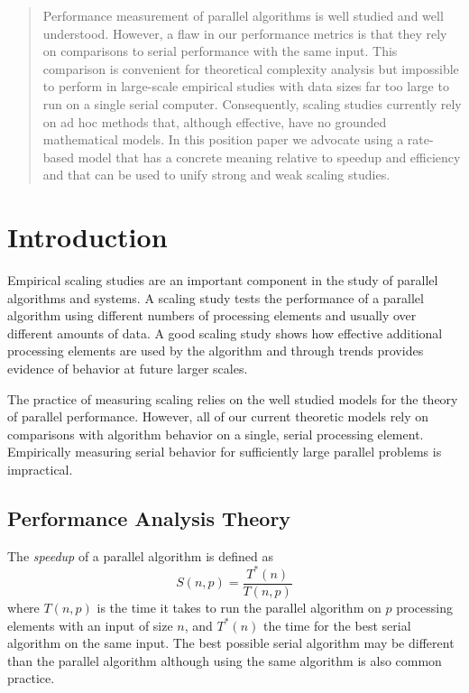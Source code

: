\documentclass[conference]{IEEEtran}
\newcommand*{\keyterm}[1]{\emph{#1}}
\begin{document}
\maketitle


\begin{abstract}
Performance measurement of parallel algorithms is well studied and well
understood. However, a flaw in our performance metrics is that they rely on
comparisons to serial performance with the same input. This comparison is
convenient for theoretical complexity analysis but impossible to perform in
large-scale empirical studies with data sizes far too large to run on a
single serial computer.  Consequently, scaling studies currently rely on ad
hoc methods that, although effective, have no grounded mathematical models.
In this position paper we advocate using a rate-based model that has a
concrete meaning relative to speedup and efficiency and that can be used to
unify strong and weak scaling studies.
\end{abstract}

\section{Introduction}

\noindent
Empirical scaling studies are an important component in the study of
parallel algorithms and systems. A scaling study tests the performance of a
parallel algorithm using different numbers of processing elements and
usually over different amounts of data. A good scaling study shows how
effective additional processing elements are used by the algorithm and
through trends provides evidence of behavior at future larger scales.

The practice of measuring scaling relies on the well studied models for the
theory of parallel performance. However, all of our current theoretic
models rely on comparisons with algorithm behavior on a single, serial
processing element. Empirically measuring serial behavior for sufficiently
large parallel problems is impractical.

\subsection{Performance Analysis Theory}

\noindent
The \keyterm{speedup} of a parallel algorithm is defined as
\begin{equation}
  S(n,p) = \frac{T^*(n)}{T(n,p)}
  \label{eq:Speedup}
\end{equation}
where $T(n,p)$ is the time it takes to run the parallel algorithm on $p$
processing elements with an input of size $n$, and $T^*(n)$ the time for the
best serial algorithm on the same input. The best possible serial algorithm
may be different than the parallel algorithm although using the same
algorithm is also common practice.
\end{document}
